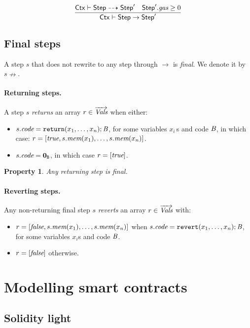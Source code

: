 \documentclass[12pt]{extarticle}
\newtheorem{property}{Property}
\begin{document}
\begin{equation}
\dfrac{
\mathsf{Ctx}\vdash\mathsf{Step}\dashrightarrow \mathsf{Step}' \quad \mathsf{Step}'.\textit{gas} \geq 0
}{
\mathsf{Ctx}\vdash\mathsf{Step}\to \mathsf{Step}'
}
\end{equation}

\subsection{Final steps}
A step $s$ that does not rewrite to any step through $\rightarrow$ is \emph{final}. We denote it by $s \nrightarrow$. 
\paragraph{Returning steps.}
A step $s$ \emph{returns} an array $r\in\overrightarrow{\textit{Vals}}$ when either:
\begin{itemize}
    \item $s.\textit{code} = \mathtt{return}(x_1,\dots,x_n);\textit{B}$, for some variables $x_i$\,s and code $\textit{B}$, in which case:
    $r = [\textit{true},s.\textit{mem}(x_1),\dots,s.\textit{mem}(x_n)]$.
    \item $s.\textit{code} = \mathbf{0}_{\texttt{B}}$, in which case $r = [\textit{true}]$.
\end{itemize}

\begin{property} 
Any returning step is final.
\end{property}
\paragraph{Reverting steps.}
Any non-returning final step $s$ \emph{reverts} an array $r\in\overrightarrow{\textit{Vals}}$ with:
\begin{itemize}
    \item $r = \left[{\textit{false}, s.\textit{mem}(x_1),\dots, s.\textit{mem}(x_n)}\right]$ when $s.\textit{code} = \mathtt{revert}(x_1,\dots,x_n);\textit{B}$, for some variables $x_i$s and code $\textit{B}$.
    \item $r = \left[{\textit{false}}\right]$ otherwise.
\end{itemize}



\newpage 

\newpage

\newpage


\section{Modelling smart contracts}
\subsection{Solidity light}\label{sec:solidity-light}
\end{document}
